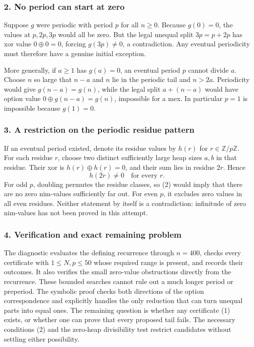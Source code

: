 \documentclass[11pt,a4paper]{article}
\begin{document}
\subsubsection{2. No period can start at zero}
Suppose $g$ were periodic with period $p$ for all $n\geq0$. Because $g(0)=0$, the values at $p,2p,3p$ would all be zero. But the legal unequal split $3p=p+2p$ has xor value $0\oplus0=0$, forcing $g(3p)\ne0$, a contradiction. Any eventual periodicity must therefore have a genuine initial exception.

More generally, if $a\geq1$ has $g(a)=0$, an eventual period $p$ cannot divide $a$. Choose $n$ so large that $n-a$ and $n$ lie in the periodic tail and $n>2a$. Periodicity would give $g(n-a)=g(n)$, while the legal split $a+(n-a)$ would have option value $0\oplus g(n-a)=g(n)$, impossible for a mex. In particular $p=1$ is impossible because $g(1)=0$.

\subsubsection{3. A restriction on the periodic residue pattern}
If an eventual period existed, denote its residue values by $h(r)$ for $r\in\mathbb Z/p\mathbb Z$. For each residue $r$, choose two distinct sufficiently large heap sizes $a,b$ in that residue. Their xor is $h(r)\oplus h(r)=0$, and their sum lies in residue $2r$. Hence
\[h(2r)\ne0\quad\text{for every }r.\tag{2}\]
For odd $p$, doubling permutes the residue classes, so (2) would imply that there are no zero nim-values sufficiently far out. For even $p$, it excludes zero values in all even residues. Neither statement by itself is a contradiction: infinitude of zero nim-values has not been proved in this attempt.

\subsubsection{4. Verification and exact remaining problem}
The diagnostic evaluates the defining recurrence through $n=400$, checks every certificate with $1\leq N,p\leq50$ whose required range is present, and records their outcomes. It also verifies the small zero-value obstructions directly from the recurrence. These bounded searches cannot rule out a much longer period or preperiod. The symbolic proof checks both directions of the option correspondence and explicitly handles the only reduction that can turn unequal parts into equal ones. The remaining question is whether any certificate (1) exists, or whether one can prove that every proposed tail fails. The necessary conditions (2) and the zero-heap divisibility test restrict candidates without settling either possibility.
\end{document}
